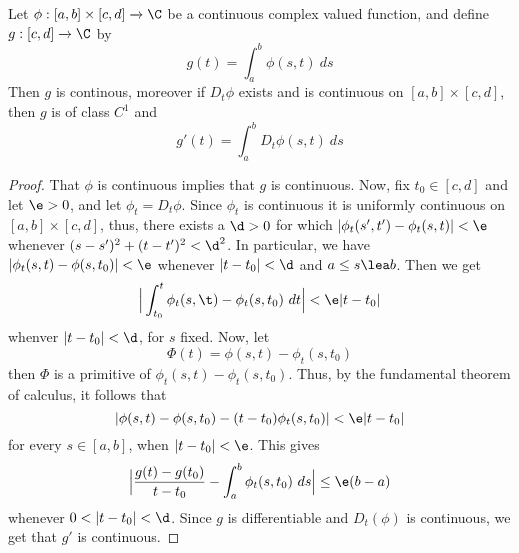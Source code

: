 \begin{theorem}\label{theorem_4.3.1}
    Let $\phi:[a,b] \times [c,d] \xrightarrow{} \C$ be a continuous complex
    valued function, and define $g:[c,d] \xrightarrow{} \C$ by
    \begin{equation*}
        g(t)=\int_a^b{\phi(s,t) \ ds}
    \end{equation*}
    Then $g$ is continous, moreover if  $D_t{\phi}$ exists and is continuous on
    $[a,b] \times [c,d]$, then $g$ is of class  $C^1$ and
    \begin{equation*}
        g'(t)=\int_a^b{D_t{\phi(s,t)} \ ds}
    \end{equation*}
\end{theorem}
\begin{proof}
    That $\phi$ is continuous implies that  $g$ is continuous. Now, fix
    $t_0 \in [c,d]$ and let $\e>0$, and let  $\phi_t=D_t{\phi}$. Since $\phi_t$
    is continuous it is uniformly continuous on $[a,b] \times [c,d]$, thus,
    there exists a $\d>0$ for which  $|\phi_t(s',t')-\phi_t(s,t)|<\e$ whenever
    $(s-s')^2+(t-t')^2<\d^2$. In particular, we have
    $|\phi_t(s,t)-\phi(s,t_0)|<\e$ whenever $|t-t_0|<\d$ and $a \leq s \lea b$.
    Then we get
    \begin{equation*}
        \Big{|} \int_{t_0}^t{\phi_t(s,\t)-\phi_t(s,t_0) \ dt} \Big{|}<\e|t-t_0|
    \end{equation*}
    whenver $|t-t_0|<\d$, for $s$ fixed. Now, let
    \begin{equation*}
        \Phi(t)=\phi(s,t)-\phi_t(s,t_0)
    \end{equation*}
    then $\Phi$ is a primitive of  $\phi_t(s,t)-\phi_t(s,t_0)$. Thus, by the
    fundamental theorem of calculus, it follows that
    \begin{equation*}
        |\phi(s,t)-\phi(s,t_0)-(t-t_0)\phi_t(s,t_0)|<\e|t-t_0|
    \end{equation*}
    for every $s \in [a,b]$, when $|t-t_0|<\e$. This gives
    \begin{equation*}
        \Big{|} \frac{g(t)-g(t_0)}{t-t_0}-\int_a^b{\phi_t(s,t_0) \ ds} \Big{|}
        \leq \e(b-a)
    \end{equation*}
    whenever $0<|t-t_0|<\d$. Since $g$ is differentiable and  $D_t(\phi)$ is
    continuous, we get that $g'$ is continuous.
\end{proof}

